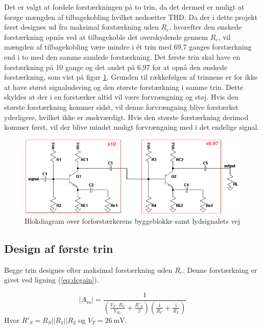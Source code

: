 Det er valgt at fordele forstærkningen på to trin, da det dermed er muligt at forøge mængden af tilbagekobling hvilket nedsætter THD. Da der i dette projekt først designes ud fra maksimal forstærkning uden $R_e$, hvorefter den ønskede forstærkning opnås ved at tilbagekoble det overskydende gennem $R_e$, vil mængden af tilbagekobling være mindre i ét trin med 69,7 ganges forstærkning end i to med den samme samlede forstærkning.
Det første trin skal have en forstærkning på 10 gange og det andet på 6,97 for at opnå den ønskede forstærkning, som vist på figur \ref{blok_forforstaerker}. Grunden til rækkefølgen af trinnene er for ikke at have størst signaludsving og den største forstærkning i samme trin. Dette skyldes at der i en forstærker altid vil være forvrængning og støj. Hvis den største forstærkning kommer sidst, vil denne forvrængning blive forstærket yderligere, hvilket ikke er ønskværdigt. Hvis den største forstærkning derimod kommer først, vil der blive mindst muligt forvrængning med i det endelige signal.

\begin{figure}[h]
\centering
\includegraphics[scale=.6]{teknisk/forforstaerker/blok_forforstaerker.png}
\caption{Blokdiagram over forforstærkerens byggeblokke samt lydsignalets vej}
\label{blok_forforstaerker}
\end{figure}



\subsection*{Design af første trin}
Begge trin designes efter maksimal forstærkning uden $R_e$. Denne forstærkning er givet ved ligning (\ref{eq:dcgain}).

\begin{equation}
|A_{\mathrm{vs}}|=\frac{1}{\left(\frac{V_T \cdot R_C}{V_{R_C}}+\frac{R'_S}{\beta}\right) \left(\frac{1}{R_C}+\frac{1}{R_L}\right)}
\label{eq:dcgain}
\end{equation}
Hvor $R'_S = R_S||R_1||R_2$ og $V_T = 26~\mathrm{mV}$.

